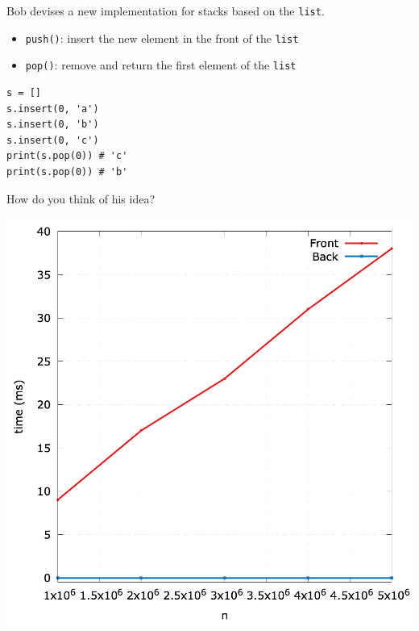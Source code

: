 \documentclass[aspectratio=169, 14pt]{beamer}
\begin{document}
\begin{frame}[fragile]
Bob devises a new implementation for stacks based on the \texttt{list}. 

\begin{itemize}
    \item \texttt{push()}: insert the new element in the front of the \texttt{list}
    \item \texttt{pop()}: remove and return the first element of the \texttt{list}
\end{itemize}

\begin{verbatim}
s = []
s.insert(0, 'a')
s.insert(0, 'b')
s.insert(0, 'c')
print(s.pop(0)) # 'c'
print(s.pop(0)) # 'b'
\end{verbatim}  
    
How do you think of his idea?
\end{frame}

\begin{frame}

\begin{center}
    \includegraphics[height=.98\paperheight]{week3/front-back}
\end{center}    

\end{frame}
\end{document}
